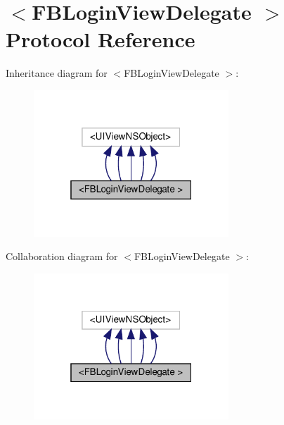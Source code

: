 \hypertarget{protocolFBLoginViewDelegate_01-p}{}\section{$<$F\+B\+Login\+View\+Delegate $>$ Protocol Reference}
\label{protocolFBLoginViewDelegate_01-p}


Inheritance diagram for $<$F\+B\+Login\+View\+Delegate $>$\+:
\nopagebreak
\begin{figure}[H]
\begin{center}
\leavevmode
\includegraphics[width=208pt]{protocolFBLoginViewDelegate_01-p__inherit__graph}
\end{center}
\end{figure}


Collaboration diagram for $<$F\+B\+Login\+View\+Delegate $>$\+:
\nopagebreak
\begin{figure}[H]
\begin{center}
\leavevmode
\includegraphics[width=208pt]{protocolFBLoginViewDelegate_01-p__coll__graph}
\end{center}
\end{figure}
